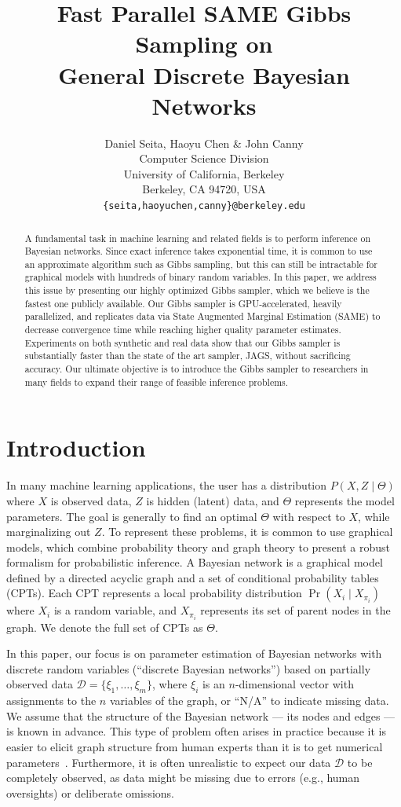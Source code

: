 \documentclass{article} %
\title{Fast Parallel SAME Gibbs Sampling on \\ General Discrete Bayesian Networks}
\author{Daniel Seita, Haoyu Chen \& John Canny \\
Computer Science Division \\
University of California, Berkeley \\
Berkeley, CA 94720, USA \\
\texttt{\{seita,haoyuchen,canny\}@berkeley.edu}
}
\begin{document}
\maketitle

\begin{abstract}
A fundamental task in machine learning and related fields is to perform inference on Bayesian
networks. Since exact inference takes exponential time, it is common to use an approximate algorithm
such as Gibbs sampling, but this can still be intractable for graphical models with hundreds of
binary random variables. In this paper, we address this issue by presenting our highly optimized
Gibbs sampler, which we believe is the fastest one publicly available.  Our Gibbs sampler is
GPU-accelerated, heavily parallelized, and replicates data via State Augmented Marginal Estimation
(SAME) to decrease convergence time while reaching higher quality parameter estimates.  Experiments
on both synthetic and real data show that our Gibbs sampler is substantially faster than the state
of the art sampler, JAGS, without sacrificing accuracy. Our ultimate objective is to introduce the
Gibbs sampler to researchers in many fields to expand their range of feasible inference problems.
\end{abstract}




\section{Introduction}\label{sec:intro}

In many machine learning applications, the user has a distribution $P(X,Z \mid \Theta)$ where $X$ is
observed data, $Z$ is hidden (latent) data, and $\Theta$ represents the model parameters. The goal
is generally to find an optimal $\Theta$ with respect to $X$, while marginalizing out $Z$. To
represent these problems, it is common to use graphical models, which combine probability theory and
graph theory to present a robust formalism for probabilistic inference. A Bayesian network is a
graphical model defined by a directed acyclic graph and a set of conditional probability tables
(CPTs). Each CPT represents a local probability distribution $\Pr(X_i \mid X_{\pi_i})$ where $X_i$
is a random variable, and $X_{\pi_i}$ represents its set of parent nodes in the graph. We denote the
full set of CPTs as $\Theta$.

In this paper, our focus is on parameter estimation of Bayesian networks with discrete random
variables (``discrete Bayesian networks'') based on partially observed data $\mathcal{D} = \{\xi_1,
\ldots, \xi_m\}$, where $\xi_i$ is an $n$-dimensional vector with assignments to the $n$ variables
of the graph, or ``N/A'' to indicate missing data. We assume that the structure of the Bayesian
network --- its nodes and edges --- is known in advance. This type of problem often arises in
practice because it is easier to elicit graph structure from human experts than it is to get
numerical parameters~\citep{Koller2009}. Furthermore, it is often unrealistic to expect our data
$\mathcal{D}$ to be completely observed, as data might be missing due to errors (e.g., human
oversights) or deliberate omissions.
\end{document}
